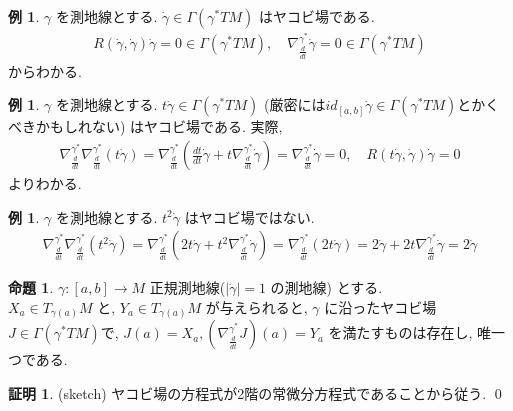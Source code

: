 \documentclass[10pt, fleqn, label-section=none]{bxjsarticle}
\theoremstyle{definition}
\newtheorem{ex}[dfn]{例}
\newtheorem{prop}[dfn]{命題}
\newtheorem*{pf*}{証明}
\newcommand{\abs}[1]{\left|#1\right|}
\renewcommand{\-}{\hyphen}
\begin{document}
\begin{ex}
$\gamma$ を測地線とする. $\dot \gamma \in \Gamma(\gamma ^* TM)$ はヤコビ場である. 
\begin{align*} R(\dot \gamma, \dot \gamma) \dot \gamma = 0 \in \Gamma(\gamma^* TM), \quad  \nabla^{\gamma^*} _{\frac{d}{dt} } \dot \gamma = 0 \in \Gamma(\gamma ^* TM)\end{align*}
からわかる.
\end{ex}

\begin{ex}
$\gamma$ を測地線とする. $t \dot \gamma \in \Gamma(\gamma ^* TM)$ (厳密には$id_{[a,b]} \dot \gamma \in \Gamma(\gamma ^* TM)$とかくべきかもしれない) はヤコビ場である. 
実際,
\begin{align*} \nabla^{\gamma^*} _{\frac{d}{dt} }\nabla^{\gamma^*} _{\frac{d}{dt} } (t \dot \gamma) = \nabla^{\gamma^*} _{\frac{d}{dt} } (\frac{dt}{dt} \dot \gamma + t \nabla^{\gamma^*} _{\frac{d}{dt} } \dot \gamma) = \nabla^{\gamma^*} _{\frac{d}{dt} } \dot \gamma = 0, \quad R(t \dot \gamma, \dot \gamma) \dot \gamma = 0 \end{align*}
よりわかる. 
\end{ex}

\begin{ex}
$\gamma$ を測地線とする. $t^2 \dot \gamma$ はヤコビ場ではない. 
\begin{align*} \nabla^{\gamma^*} _{\frac{d}{dt} }\nabla^{\gamma^*} _{\frac{d}{dt} } (t^2 \dot \gamma) = \nabla^{\gamma^*} _{\frac{d}{dt} }  (2t \dot \gamma + t^2 \nabla^{\gamma^*} _{\frac{d}{dt} } \dot \gamma) = \nabla^{\gamma^*} _{\frac{d}{dt} } (2t \dot \gamma) = 2 \dot \gamma + 2t \nabla^{\gamma^*} _{\frac{d}{dt} } \dot \gamma = 2 \dot \gamma \end{align*}

\end{ex}

\begin{prop}
$\gamma : [a,b] \rightarrow M$ 正規測地線($\abs{\dot \gamma } = 1$ の測地線) とする. \\
$X_a \in T_{\gamma (a) } M$ と, $Y_a \in T_{\gamma (a) } M$ が与えられると, $\gamma $ に沿ったヤコビ場$J \in \Gamma(\gamma ^* TM)$で, $J(a) = X_a, (\nabla^{\gamma^*} _{\frac{d}{dt} } J )(a) = Y_a$ を満たすものは存在し, 唯一つである. 
\end{prop}
\begin{pf*}
(sketch) ヤコビ場の方程式が2階の常微分方程式であることから従う.
\qed
\end{pf*}
\end{document}
